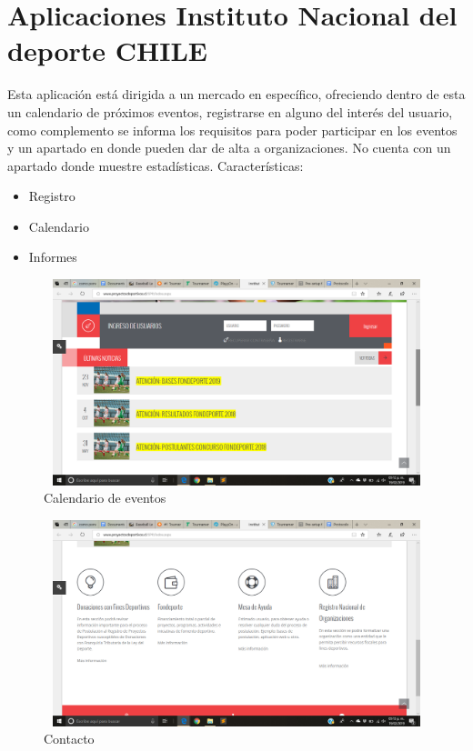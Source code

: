 	\section{Aplicaciones Instituto Nacional del deporte CHILE}
	Esta aplicación está dirigida a un mercado en específico, ofreciendo dentro de esta un calendario de próximos eventos, registrarse en alguno del interés del usuario, como complemento se informa los requisitos para poder participar en los eventos y  un apartado en donde pueden dar de alta a organizaciones. No cuenta con un apartado donde muestre estadísticas.
	Características: 
	\begin{itemize}
		\item Registro
		\item Calendario
		\item Informes
		
	\end{itemize}
	\begin{figure}[hbt!]
		\centering
		\includegraphics[width=12cm, height=6cm]{Imagenes/Aplicaciones/INDC1.png}
		\caption{Calendario de eventos}
	\end{figure}
	\begin{figure}[hbt!]
		\centering
		\includegraphics[width=12cm, height=6cm]{Imagenes/Aplicaciones/INDC2.png}
		\caption{Contacto}
	\end{figure}
	